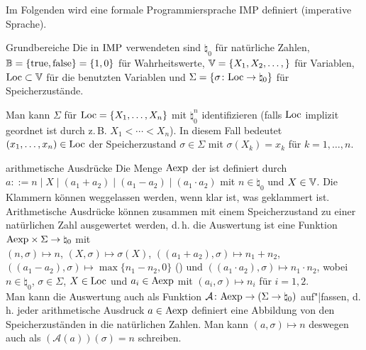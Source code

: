 \begin{Bem}
    Im Folgenden wird eine formale Programmiersprache IMP definiert
    (imperative Sprache).
\end{Bem}

\begin{Def}{Grundbereiche}
    Die in $\text{IMP}$ verwendeten  sind $\natural_0$ für natürliche Zahlen,
    $\mathbb{B} = \{\text{true}, \text{false}\} = \{1, 0\}$ für Wahrheitswerte,
    $\mathbb{V} = \{X_1, X_2, \dotsc,\}$ für Variablen,
    $\text{Loc} \subset \mathbb{V}$ für die benutzten Variablen und
    $\Sigma = \{\sigma\colon \text{Loc} \rightarrow \natural_0\}$ für Speicherzustände.
\end{Def}

\begin{Bem}
    Man kann $\Sigma$ für $\text{Loc} = \{X_1, \dotsc, X_n\}$ mit $\natural_0^n$ identifizieren
    (falls $\text{Loc}$ implizit geordnet ist durch z.\,B. $X_1 < \dotsb < X_n$).
    In diesem Fall bedeutet $(x_1, \dotsc, x_n) \in \text{Loc}$ der Speicherzustand
    $\sigma \in \Sigma$ mit $\sigma(X_k) = x_k$ für $k = 1, \dotsc, n$.
\end{Bem}

\begin{Def}{arithmetische Ausdrücke}
    Die Menge $\text{Aexp}$ der  ist definiert durch
    $a ::= n \;|\; X \;|\; (a_1 + a_2) \;|\; (a_1 - a_2) \;|\; (a_1 \cdot a_2)$
    mit $n \in \natural_0$ und $X \in \mathbb{V}$.
    Die Klammern können weggelassen werden, wenn klar ist, was geklammert ist.\\
    Arithmetische Ausdrücke können zusammen mit einem Speicherzustand zu einer natürlichen
    Zahl ausgewertet werden, d.\,h. die Auswertung ist eine Funktion
    $\text{Aexp} \times \Sigma \rightarrow \natural_0$ mit\\
    $(n, \sigma) \mapsto n$,
    $(X, \sigma) \mapsto \sigma(X)$,
    $((a_1 + a_2), \sigma) \mapsto n_1 + n_2$,
    $((a_1 - a_2), \sigma) \mapsto \max\{n_1 - n_2, 0\}$ () und
    $((a_1 \cdot a_2), \sigma) \mapsto n_1 \cdot n_2$,
    wobei $n \in \natural_0$, $\sigma \in \Sigma$, $X \in \text{Loc}$ und $a_i \in \text{Aexp}$ mit
    $(a_i, \sigma) \mapsto n_i$ für $i = 1, 2$.\\
    Man kann die Auswertung auch als Funktion
    $\mathcal{A}\colon \text{Aexp} \rightarrow (\Sigma \rightarrow \natural_0)$ auf"|fassen,
    d.\,h. jeder arithmetische Ausdruck $a \in \text{Aexp}$ definiert eine Abbildung von den
    Speicherzuständen in die natürlichen Zahlen.
    Man kann $(a, \sigma) \mapsto n$ deswegen auch als $(\mathcal{A}(a))(\sigma) = n$ schreiben.
\end{Def}

